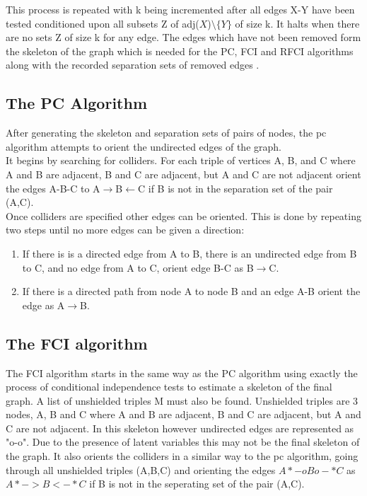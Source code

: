 \documentclass{article}
\begin{document}
This process is repeated with k being incremented after all edges X-Y have been tested conditioned upon all subsets Z of adj($X$)$\setminus \{Y\}$ of size k. It halts when there are no sets Z of size k for any edge. The edges which have not been removed form the skeleton of the graph which is needed for the PC, FCI and RFCI algorithms along with the recorded separation sets of removed edges \cite{colombo2012learning, spirtes1991algorithm}.
\\

\subsection{The PC Algorithm}
After generating the skeleton and separation sets of pairs of nodes, the pc algorithm attempts to orient the undirected edges of the graph.
\\

It begins by searching for colliders. For each triple of vertices A, B, and C where A and B are adjacent, B and C are adjacent, but A and C are not adjacent orient the edges A-B-C to A$\rightarrow$B$\leftarrow$C if B is not in the separation set of the pair (A,C).
\\

Once colliders are specified other edges can be oriented. This is done by repeating two steps until no more edges can be given a direction:
\\

\begin{enumerate}[i]
  \item If there is is a directed edge from A to B, there is an undirected edge from B to C, and no edge from A to C, orient edge B-C as B$\rightarrow$C.
  \item If there is a directed path from node A to node B and an edge A-B orient the edge as A$\rightarrow$B\cite{spirtes1991algorithm}. 
\end{enumerate}


\subsection{The FCI algorithm}

The FCI algorithm starts in the same way as the PC algorithm using exactly the process of conditional independence tests to estimate a skeleton of the final graph. A list of unshielded triples M must also be found. Unshielded triples are 3 nodes, A, B and C where A and B are adjacent, B and C are adjacent, but A and C are not adjacent. In this skeleton however undirected edges are represented as "o-o". Due to the presence of latent variables this may not be the final skeleton of the graph. It also orients the colliders in a similar way to the pc algorithm, going through all unshielded triples (A,B,C) and orienting the edges $A*-oBo-*C$ as $A*->B<-*C$ if B is not in the seperating set of the pair (A,C).
\\
\end{document}
